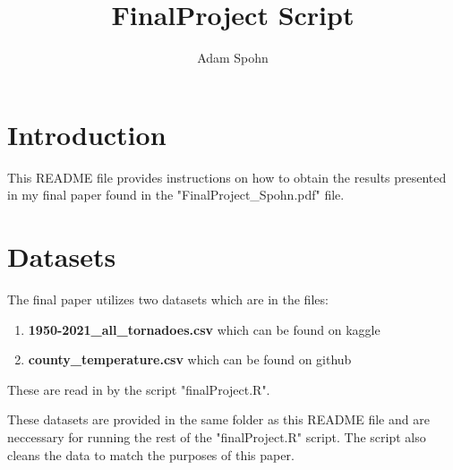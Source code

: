 \documentclass{article}
\title{FinalProject Script}
\author{Adam Spohn}
\begin{document}
\maketitle

\section{Introduction}
This README file provides instructions on how to obtain the results presented in my final paper found in the "FinalProject\_Spohn.pdf" file. 

\section{Datasets}
The final paper utilizes two datasets which are in the files:
\begin{enumerate}
    \item \textbf{1950-2021\_all\_tornadoes.csv} which can be found on kaggle
    \item \textbf{county\_temperature.csv} which can be found on github
    \end{enumerate}
    These are read in by the script "finalProject.R".

These datasets are provided in the same folder as this README file and are neccessary for running the rest of the "finalProject.R" script. The script also cleans the data to match the purposes of this paper.
\end{document}
